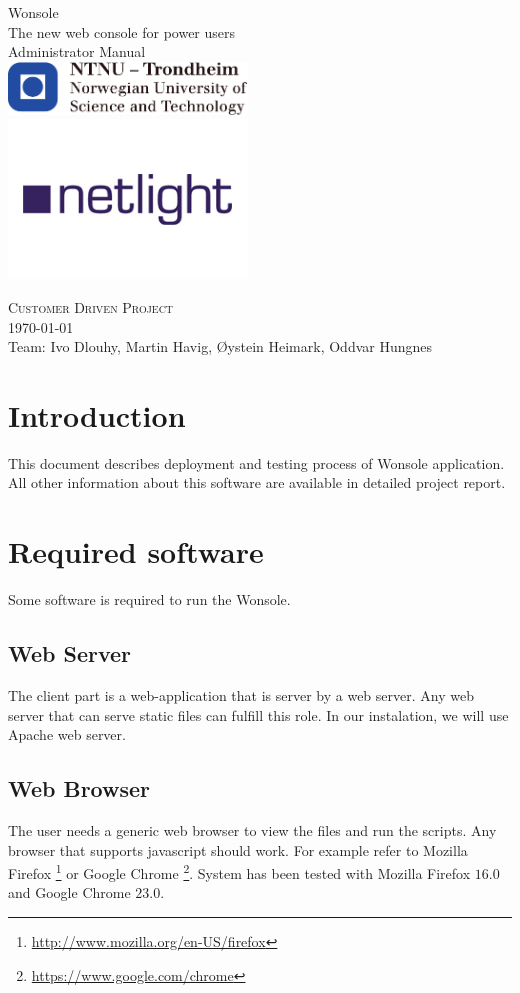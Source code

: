 \documentclass[10pt,a4paper,oneside]{report}
\begin{document}
\thispagestyle{empty}
\begin{center}
	{\Huge Wonsole} \\
	\medskip
	{\LARGE The new web console for power users} \\ 
	\bigskip
	{\Huge Administrator Manual} \\ 
	\includegraphics[width=2.5in]{image/logo-ntnu.pdf} \\
	\includegraphics[width=2.5in]{image/logo-netlight.png}
\end{center}
{\Large \textsc{Customer Driven Project}} \\
{\large \today \\Team: Ivo Dlouhy, Martin Havig, Øystein Heimark, Oddvar Hungnes}
\newpage


\setcounter{tocdepth}{1}
\tableofcontents
\clearpage
\chapter{Introduction}
This document describes deployment and testing process of Wonsole application.
All other information about this software are available in detailed project
report.
\chapter{Required software}
Some software is required to run the Wonsole. 
\section{Web Server}
The client part is a web-application that is server by a web server. Any web
server that can serve static files can fulfill this role. In our instalation, we will use Apache web server.

\section{Web Browser}
The user needs a generic web browser to view the files and run the scripts. Any
browser that supports javascript should work. For example refer to Mozilla
Firefox \footnote{\url{http://www.mozilla.org/en-US/firefox}} or Google Chrome
\footnote{\url{https://www.google.com/chrome}}. System has been tested with
Mozilla Firefox $16.0$ and Google Chrome $23.0$. 
\end{document}
